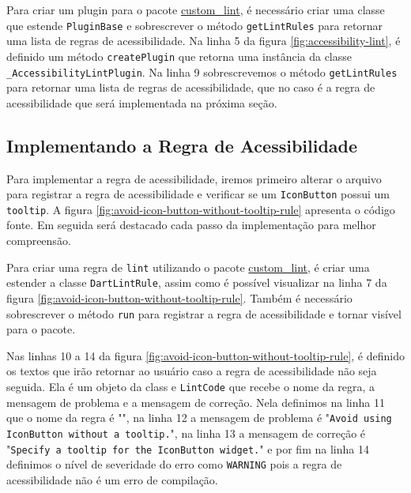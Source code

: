 Para criar um plugin para o pacote \href{https://pub.dev/packages/custom_lint}{custom\_lint}, é necessário criar uma classe que estende \texttt{PluginBase} e sobrescrever o método \texttt{getLintRules} para retornar uma lista de regras de acessibilidade. Na linha 5 da figura \ref{fig:accessibility-lint}, é definido um método \texttt{createPlugin} que retorna uma instância da classe \texttt{\_AccessibilityLintPlugin}. Na linha 9 sobrescrevemos o método \texttt{getLintRules} para retornar uma lista de regras de acessibilidade, que no caso é a regra de acessibilidade  que será implementada na próxima seção.

\subsection{Implementando a Regra de Acessibilidade}

Para implementar a regra de acessibilidade, iremos primeiro alterar o arquivo  para registrar a regra de acessibilidade e verificar se um \texttt{IconButton} possui um \texttt{tooltip}. A figura \ref{fig:avoid-icon-button-without-tooltip-rule} apresenta o código fonte. Em seguida será destacado cada passo da implementação para melhor compreensão.

Para criar uma regra de \texttt{lint} utilizando o pacote \href{https://pub.dev/packages/custom_lint}{custom\_lint}, é criar uma estender a classe \texttt{DartLintRule}, assim como é possível visualizar na linha 7 da figura \ref{fig:avoid-icon-button-without-tooltip-rule}. Também é necessário sobrescrever o método \texttt{run} para registrar a regra de acessibilidade e tornar visível para o pacote.

Nas linhas 10 a 14 da figura \ref{fig:avoid-icon-button-without-tooltip-rule}, é definido os textos que irão retornar ao usuário caso a regra de acessibilidade não seja seguida. Ela é um objeto da class e \texttt{LintCode} que recebe o nome da regra, a mensagem de problema e a mensagem de correção. Nela definimos na linha 11 que o nome da regra é "", na linha 12 a mensagem de problema é "\texttt{Avoid using IconButton without a tooltip.}", na linha 13 a mensagem de correção é "\texttt{Specify a tooltip for the IconButton widget.}" e por fim na linha 14 definimos o nível de severidade do erro como \texttt{WARNING} pois a regra de acessibilidade não é um erro de compilação.

